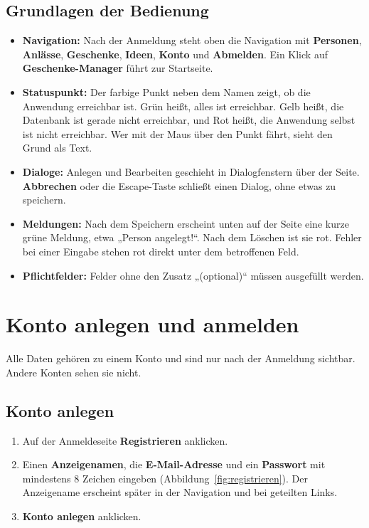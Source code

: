 \documentclass[11pt,a4paper]{article}
\newcommand{\ui}[1]{\textbf{#1}}
\begin{document}
\subsection{Grundlagen der Bedienung}

\begin{itemize}
  \item \textbf{Navigation:} Nach der Anmeldung steht oben die Navigation mit \ui{Personen}, \ui{Anlässe}, \ui{Geschenke}, \ui{Ideen}, \ui{Konto} und \ui{Abmelden}. Ein Klick auf \ui{Geschenke-Manager} führt zur Startseite.
  \item \textbf{Statuspunkt:} Der farbige Punkt neben dem Namen zeigt, ob die Anwendung erreichbar ist. Grün heißt, alles ist erreichbar. Gelb heißt, die Datenbank ist gerade nicht erreichbar, und Rot heißt, die Anwendung selbst ist nicht erreichbar. Wer mit der Maus über den Punkt fährt, sieht den Grund als Text.
  \item \textbf{Dialoge:} Anlegen und Bearbeiten geschieht in Dialogfenstern über der Seite. \ui{Abbrechen} oder die Escape-Taste schließt einen Dialog, ohne etwas zu speichern.
  \item \textbf{Meldungen:} Nach dem Speichern erscheint unten auf der Seite eine kurze grüne Meldung, etwa „Person angelegt!“. Nach dem Löschen ist sie rot. Fehler bei einer Eingabe stehen rot direkt unter dem betroffenen Feld.
  \item \textbf{Pflichtfelder:} Felder ohne den Zusatz „(optional)“ müssen ausgefüllt werden.
\end{itemize}

\section{Konto anlegen und anmelden}\label{sec:konto}

Alle Daten gehören zu einem Konto und sind nur nach der Anmeldung sichtbar. Andere Konten sehen sie nicht.

\subsection{Konto anlegen}

\begin{enumerate}
  \item Auf der Anmeldeseite \ui{Registrieren} anklicken.
  \item Einen \ui{Anzeigenamen}, die \ui{E-Mail-Adresse} und ein \ui{Passwort} mit mindestens 8 Zeichen eingeben (Abbildung~\ref{fig:registrieren}). Der Anzeigename erscheint später in der Navigation und bei geteilten Links.
  \item \ui{Konto anlegen} anklicken.
\end{enumerate}
\end{document}
